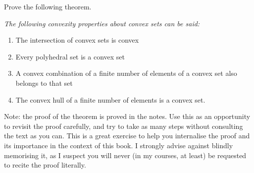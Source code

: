 Prove the following theorem.

\begin{theorem*} 
	\emph{The following convexity properties about convex sets can be said:}
	\begin{enumerate}
		\item The intersection of convex sets is convex
		\item Every polyhedral set is a convex set
		\item A convex combination of a finite number of elements of a convex set also belongs to that set
		\item The convex hull of a finite number of elements is a convex set.			
	\end{enumerate}
\end{theorem*}

Note: the proof of the theorem is proved in the notes. Use this as an opportunity to revisit the proof carefully, and try to take as many steps without consulting the text as you can. This is a great exercise to help you internalise the proof and its importance in the context of this book. I strongly advise against blindly memorising it, as I suspect you will never (in my courses, at least) be requested to recite the proof literally.
